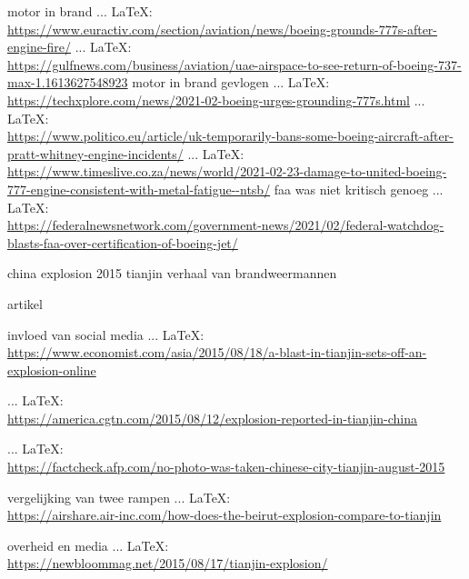 \begin{thebibliography}{99}
motor in brand
 ... \LaTeX:\\ \url{https://www.euractiv.com/section/aviation/news/boeing-grounds-777s-after-engine-fire/}
 ... \LaTeX:\\ \url{https://gulfnews.com/business/aviation/uae-airspace-to-see-return-of-boeing-737-max-1.1613627548923}
motor in brand gevlogen
 ... \LaTeX:\\ \url{https://techxplore.com/news/2021-02-boeing-urges-grounding-777s.html}
 ... \LaTeX:\\ \url{https://www.politico.eu/article/uk-temporarily-bans-some-boeing-aircraft-after-pratt-whitney-engine-incidents/}
 ... \LaTeX:\\ \url{https://www.timeslive.co.za/news/world/2021-02-23-damage-to-united-boeing-777-engine-consistent-with-metal-fatigue--ntsb/}
faa was niet kritisch genoeg
 ... \LaTeX:\\ \url{https://federalnewsnetwork.com/government-news/2021/02/federal-watchdog-blasts-faa-over-certification-of-boeing-jet/}







china explosion 2015 tianjin
    verhaal van brandweermannen
    
    artikel
    
    invloed van social media
     ... \LaTeX:\\ \url{https://www.economist.com/asia/2015/08/18/a-blast-in-tianjin-sets-off-an-explosion-online}

     ... \LaTeX:\\ \url{https://america.cgtn.com/2015/08/12/explosion-reported-in-tianjin-china}

     ... \LaTeX:\\ \url{https://factcheck.afp.com/no-photo-was-taken-chinese-city-tianjin-august-2015}

    vergelijking van twee rampen
     ... \LaTeX:\\ \url{https://airshare.air-inc.com/how-does-the-beirut-explosion-compare-to-tianjin}

    overheid en media
     ... \LaTeX:\\ \url{https://newbloommag.net/2015/08/17/tianjin-explosion/}


\end{thebibliography}
